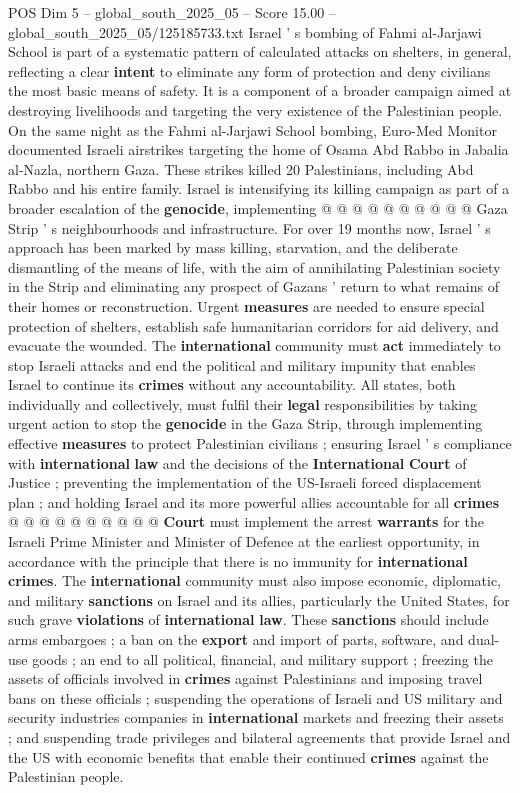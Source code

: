 \begin{textsample}{POS Dim 5 – global\_south\_2025\_05 – Score 15.00 – global\_south\_2025\_05/125185733.txt}
Israel ' s bombing of Fahmi al-Jarjawi School is part of a systematic pattern of calculated attacks on shelters, in general, reflecting a clear \textbf{intent} to eliminate any form of protection and deny civilians the most basic means of safety.
It is a component of a broader campaign aimed at destroying livelihoods and targeting the very existence of the Palestinian people.
On the same night as the Fahmi al-Jarjawi School bombing, Euro-Med Monitor documented Israeli airstrikes targeting the home of Osama Abd Rabbo in Jabalia al-Nazla, northern Gaza.
These strikes killed 20 Palestinians, including Abd Rabbo and his entire family.
Israel is intensifying its killing campaign as part of a broader escalation of the \textbf{genocide}, implementing @ @ @ @ @ @ @ @ @ @ Gaza Strip ' s neighbourhoods and infrastructure.
For over 19 months now, Israel ' s approach has been marked by mass killing, starvation, and the deliberate dismantling of the means of life, with the aim of annihilating Palestinian society in the Strip and eliminating any prospect of Gazans ' return to what remains of their homes or reconstruction.
Urgent \textbf{measures} are needed to ensure special protection of shelters, establish safe humanitarian corridors for aid delivery, and evacuate the wounded.
The \textbf{international} community must \textbf{act} immediately to stop Israeli attacks and end the political and military impunity that enables Israel to continue its \textbf{crimes} without any accountability.
All states, both individually and collectively, must fulfil their \textbf{legal} responsibilities by taking urgent action to stop the \textbf{genocide} in the Gaza Strip, through implementing effective \textbf{measures} to protect Palestinian civilians ; ensuring Israel ' s compliance with \textbf{international} \textbf{law} and the decisions of the \textbf{International} \textbf{Court} of Justice ; preventing the implementation of the US-Israeli forced displacement plan ; and holding Israel and its more powerful allies accountable for all \textbf{crimes} @ @ @ @ @ @ @ @ @ @ \textbf{Court} must implement the arrest \textbf{warrants} for the Israeli Prime Minister and Minister of Defence at the earliest opportunity, in accordance with the principle that there is no immunity for \textbf{international} \textbf{crimes}.
The \textbf{international} community must also impose economic, diplomatic, and military \textbf{sanctions} on Israel and its allies, particularly the United States, for such grave \textbf{violations} of \textbf{international} \textbf{law}.
These \textbf{sanctions} should include arms embargoes ; a ban on the \textbf{export} and import of parts, software, and dual-use goods ; an end to all political, financial, and military support ; freezing the assets of officials involved in \textbf{crimes} against Palestinians and imposing travel bans on these officials ; suspending the operations of Israeli and US military and security industries companies in \textbf{international} markets and freezing their assets ; and suspending trade privileges and bilateral agreements that provide Israel and the US with economic benefits that enable their continued \textbf{crimes} against the Palestinian people.

\end{textsample}
